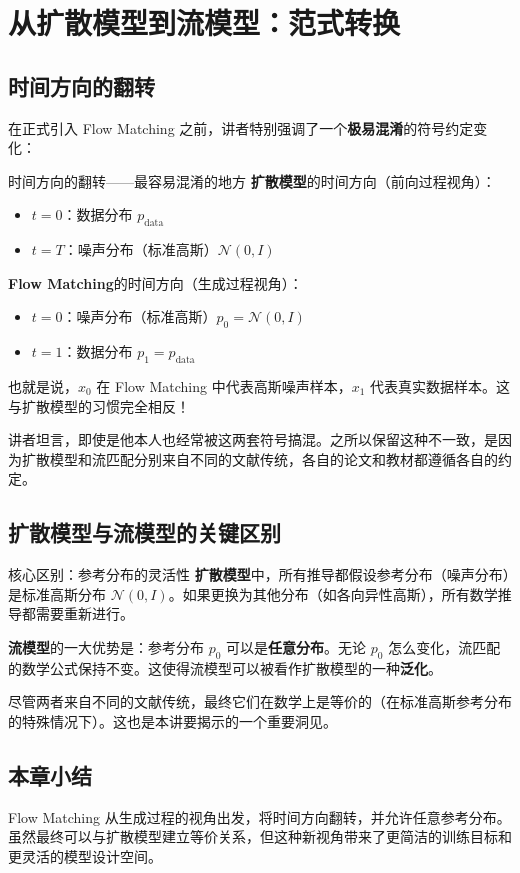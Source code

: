 \section{从扩散模型到流模型：范式转换}

\subsection{时间方向的翻转}

在正式引入 Flow Matching 之前，讲者特别强调了一个\textbf{极易混淆}的符号约定变化：

\begin{warningbox}{时间方向的翻转——最容易混淆的地方}
\textbf{扩散模型}的时间方向（前向过程视角）：
\begin{itemize}
    \item $t = 0$：数据分布 $p_{\text{data}}$
    \item $t = T$：噪声分布（标准高斯）$\mathcal{N}(0, I)$
\end{itemize}

\textbf{Flow Matching}的时间方向（生成过程视角）：
\begin{itemize}
    \item $t = 0$：噪声分布（标准高斯）$p_0 = \mathcal{N}(0, I)$
    \item $t = 1$：数据分布 $p_1 = p_{\text{data}}$
\end{itemize}

也就是说，$x_0$ 在 Flow Matching 中代表高斯噪声样本，$x_1$ 代表真实数据样本。这与扩散模型的习惯完全相反！
\end{warningbox}

讲者坦言，即使是他本人也经常被这两套符号搞混。之所以保留这种不一致，是因为扩散模型和流匹配分别来自不同的文献传统，各自的论文和教材都遵循各自的约定。

\subsection{扩散模型与流模型的关键区别}

\begin{importantbox}{核心区别：参考分布的灵活性}
\textbf{扩散模型}中，所有推导都假设参考分布（噪声分布）是标准高斯分布 $\mathcal{N}(0, I)$。如果更换为其他分布（如各向异性高斯），所有数学推导都需要重新进行。

\textbf{流模型}的一大优势是：参考分布 $p_0$ 可以是\textbf{任意分布}。无论 $p_0$ 怎么变化，流匹配的数学公式保持不变。这使得流模型可以被看作扩散模型的一种\textbf{泛化}。
\end{importantbox}

尽管两者来自不同的文献传统，最终它们在数学上是等价的（在标准高斯参考分布的特殊情况下）。这也是本讲要揭示的一个重要洞见。

\subsection{本章小结}

Flow Matching 从生成过程的视角出发，将时间方向翻转，并允许任意参考分布。虽然最终可以与扩散模型建立等价关系，但这种新视角带来了更简洁的训练目标和更灵活的模型设计空间。

